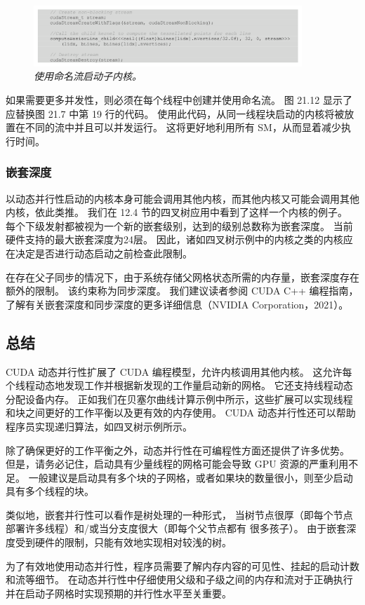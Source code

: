 \begin{figure}[H]
	\centering
	\includegraphics[width=0.9\textwidth]{figs/F21.12.png}
	\caption{\textit{使用命名流启动子内核。}}
\end{figure}

如果需要更多并发性，则必须在每个线程中创建并使用命名流。 图 21.12 显示了应替换图 21.7 中第 19 行的代码。 
使用此代码，从同一线程块启动的内核将被放置在不同的流中并且可以并发运行。 这将更好地利用所有 SM，从而显着减少执行时间。

\subsubsection{嵌套深度}
以动态并行性启动的内核本身可能会调用其他内核，而其他内核又可能会调用其他内核，依此类推。 
我们在 12.4 节的四叉树应用中看到了这样一个内核的例子。 每个下级发射都被视为一个新的嵌套级别，达到的级别总数称为嵌套深度。 
当前硬件支持的最大嵌套深度为24层。 因此，诸如四叉树示例中的内核之类的内核应在决定是否进行动态启动之前检查此限制。

在存在父子同步的情况下，由于系统存储父网格状态所需的内存量，嵌套深度存在额外的限制。 该约束称为同步深度。 
我们建议读者参阅 CUDA C++ 编程指南，了解有关嵌套深度和同步深度的更多详细信息（NVIDIA Corporation，2021）。

\subsection{总结}
CUDA 动态并行性扩展了 CUDA 编程模型，允许内核调用其他内核。 
这允许每个线程动态地发现工作并根据新发现的工作量启动新的网格。 
它还支持线程动态分配设备内存。 
正如我们在贝塞尔曲线计算示例中所示，这些扩展可以实现线程和块之间更好的工作平衡以及更有效的内存使用。 
CUDA 动态并行性还可以帮助程序员实现递归算法，如四叉树示例所示。

除了确保更好的工作平衡之外，动态并行性在可编程性方面还提供了许多优势。 
但是，请务必记住，启动具有少量线程的网格可能会导致 GPU 资源的严重利用不足。 
一般建议是启动具有多个块的子网格，或者如果块的数量很小，则至少启动具有多个线程的块。

类似地，嵌套并行性可以看作是树处理的一种形式，
当树节点很厚（即每个节点部署许多线程）和/或当分支度很大（即每个父节点都有 很多孩子）。 
由于嵌套深度受到硬件的限制，只能有效地实现相对较浅的树。

为了有效地使用动态并行性，程序员需要了解内存内容的可见性、挂起的启动计数和流等细节。 
在动态并行性中仔细使用父级和子级之间的内存和流对于正确执行并在启动子网格时实现预期的并行性水平至关重要。